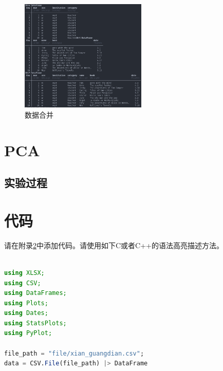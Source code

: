 \documentclass[a4paper]{article}
\begin{document}
\begin{figure}[h]
    \centering
    \includegraphics[width=6cm]{images/合并.png}
    \caption{数据合并}
    \label{fig:combine}
\end{figure}

\newpage

\section{PCA}\label{sub:PCA}
\subsection{实验过程} \label{sub:PCA-lab}

\newpage

\appendix
\section{代码}\label{sub:app.code}
请在附录\ref{sub:app.code}中添加代码。请使用如下C或者C++的语法高亮描述方法。
\begin{lstlisting}[language=julia]

using XLSX;
using CSV;
using DataFrames;
using Plots;
using Dates;
using StatsPlots;
using PyPlot;

file_path = "file/xian_guangdian.csv";
data = CSV.File(file_path) |> DataFrame

\end{lstlisting}
\end{document}
